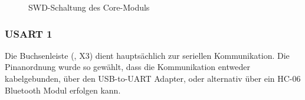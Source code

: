 \begin{figure}[htb]
    \centering
    \qquad
    \qquad
    \caption[SWD-Schaltung des Core-Moduls]{SWD-Schaltung des \gls{Core-Modul}s}
    \label{fig:coremodul-swd2}
\end{figure}

\subsubsection{USART 1}
Die Buchsenleiste (, X3) dient hauptsächlich zur seriellen Kommunikation. Die Pinanordnung wurde so gewählt, dass die Kommunikation entweder kabelgebunden, über den \gls{USB-to-UART} Adapter, oder alternativ über ein HC-06 Bluetooth Modul erfolgen kann.

